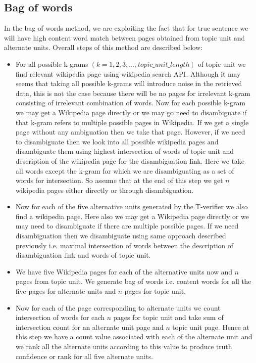 \documentclass[12pt]{article}
\begin{document}
\subsection{Bag of words}
In the bag of words method, we are exploiting the fact that for true sentence we will have high content word match between pages obtained from topic unit and alternate units. Overall steps of this method are described below:
\begin{itemize}
\item For all possible k-grams $(k=1,2,3,...,topic\_unit\_length)$ of topic unit we find relevant wikipedia page using wikipedia search API. Although it may seems that taking all possible k-grams will introduce noise in the retrieved data, this is not the case because there will be no pages for irrelevant k-gram consisting of irrelevant combination of words. Now for each possible k-gram we may get a Wikipedia page directly or we may go need to disambiguate if that k-gram refers to multiple possible pages in Wikipedia. If we get a single page without any ambiguation then we take that page. However, if we need to disambiguate then we look into all possible wikipedia pages and disambiguate them using highest intersection of words of topic unit and description of the wikipedia page for the disambiguation link. Here we take all words except the k-gram for which we are disambiguating as a set of words for intersection. So assume that at the end of this step we get $n$ wikipedia pages either directly or through disambiguation.

\item Now for each of the five alternative units generated by the T-verifier we also find a wikipedia page. Here also we may get a Wikipedia page directly or we may need to disambiguate if there are multiple possible pages. If we need disambiguation then we disambiguate using same approach described previously i.e. maximal intersection of words between the description of disambiguation link and words of topic unit.

\item We have five Wikipedia pages for each of the alternative units now and $n$ pages from topic unit. We generate bag of words i.e. content words for all the five pages for alternate units and $n$ pages for topic unit.

\item Now for each of the page corresponding to alternate units we count intersection of words for each $n$ pages for topic unit and take sum of  intersection count for an alternate unit page and $n$ topic unit page. Hence at this step we have a count value associated with each of the alternate unit and we rank all the alternate units according to this value to produce truth confidence or rank for all five alternate units.
\end{itemize}
\end{document}
